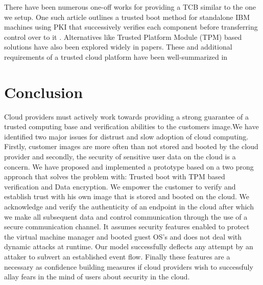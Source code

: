 \documentclass[10pt,twocolumn,pdftex]{article}
\begin{document}
There have been numerous one-off works for providing a TCB similar to the one we setup. One such article outlines a trusted boot method for standalone IBM machines using PKI that successively verifies each component before transferring control over to it \cite{Arbaugh:1997:SRB:882493.884371}. Alternatives like Trusted Platform Module (TPM) \cite{TCG} based solutions have also been explored widely in papers\cite{towards-trusted-cloud-computing, terra, semantic-remote, Garfinkel03flexibleos}.
These and additional requirements of a trusted cloud platform have been well-summarized in \cite{seeding-clouds-with-trust-anchors} 
\label{sec:related}

\section{Conclusion}
\label{sec:conclusion}
Cloud providers must actively work towards providing a strong guarantee of a trusted computing base and verification abilities to the customers image.We have identified two major issues for distrust and slow adoption of cloud computing. Firstly, customer images are more often than not stored and booted by the cloud provider and secondly, the security of sensitive user data on the cloud is a concern. We have proposed and implemented a prototype based on a two prong approach that solves the problem with: Trusted boot with TPM based verification and Data encryption. We empower the customer to verify and establish trust with his own image that is stored and booted on the cloud. We acknowledge and verify the authenticity of an endpoint in the cloud after which we make all subsequent data and control communication through the use of a secure communication channel.  It assumes security features enabled to protect the virtual machine manager and booted guest OS's and does not deal with dynamic attacks at runtime. Our model successfully deflects any attempt by an attaker to subvert an established event flow. Finally these features are a necessary as confidence building measures if cloud providers wish to successfuly allay fears in the mind of users about security in the cloud.

{}

\end{document}
